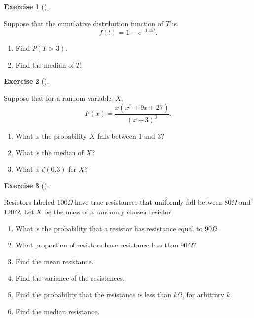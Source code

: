 \documentclass[
  letterpaper,
  DIV=11,
  numbers=noendperiod]{scrreprt}
\providecommand{\tightlist}{%
  \setlength{\itemsep}{0pt}\setlength{\parskip}{0pt}}\usepackage{longtable,booktabs,array}
\theoremstyle{definition}
\newtheorem{exercise}{Exercise}[chapter]
\theoremstyle{definition}
\theoremstyle{definition}
\theoremstyle{remark}
\begin{document}
\begin{exercise}[]\protect\hypertarget{exr-9.6}{}\label{exr-9.6}

Suppose that the cumulative distribution function of \(T\) is
\[f(t) = 1 - e^{-0.45t}.\]

\begin{enumerate}
\def\labelenumi{\alph{enumi}.}
\tightlist
\item
  Find \(P(T > 3)\).
\item
  Find the median of \(T\).
\end{enumerate}

\end{exercise}

\begin{exercise}[]\protect\hypertarget{exr-9.7}{}\label{exr-9.7}

Suppose that for a random variable, \(X\),
\[F(x) = \frac{x(x^2 + 9x + 27)}{(x+3)^3}.\]

\begin{enumerate}
\def\labelenumi{\alph{enumi}.}
\tightlist
\item
  What is the probability \(X\) falls between \(1\) and \(3\)?
\item
  What is the median of \(X\)?
\item
  What is \(\zeta(0.3)\) for \(X\)?
\end{enumerate}

\end{exercise}

\begin{exercise}[]\protect\hypertarget{exr-9.8}{}\label{exr-9.8}

Resistors labeled \(100\Omega\) have true resistances that uniformly
fall between \(80\Omega\) and \(120\Omega\). Let \(X\) be the mass of a
randomly chosen resistor.

\begin{enumerate}
\def\labelenumi{\alph{enumi}.}
\tightlist
\item
  What is the probability that a resistor has resistance equal to
  \(90\Omega\).
\item
  What proportion of resistors have resistance less than \(90\Omega\)?
\item
  Find the mean resistance.
\item
  Find the variance of the resistances.
\item
  Find the probability that the resistance is less than \(k\Omega\), for
  arbitrary \(k\).
\item
  Find the median resistance.
\end{enumerate}

\end{exercise}
\end{document}
